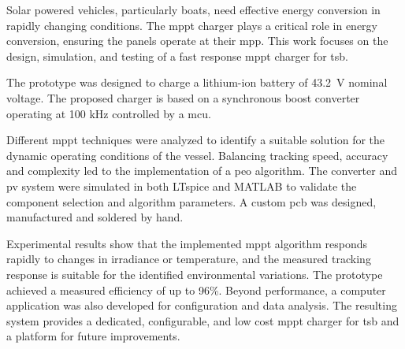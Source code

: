

\noindent Solar powered vehicles, particularly boats, need effective energy conversion in rapidly changing conditions. The \ac{mppt} charger plays a critical role in energy conversion, ensuring the panels operate at their \ac{mpp}. This work focuses on the design, simulation, and testing of a fast response \ac{mppt} charger for \ac{tsb}.

The prototype was designed to charge a lithium-ion battery of 43.2~V nominal voltage. The proposed charger is based on a synchronous boost converter operating at 100 kHz controlled by a \ac{mcu}. 

Different \ac{mppt} techniques were analyzed to identify a suitable solution for the dynamic operating conditions of the vessel. Balancing tracking speed, accuracy and complexity led to the implementation of a \ac{peo} algorithm. The converter and \ac{pv} system were simulated in both LTspice and MATLAB to validate the component selection and algorithm parameters. A custom \ac{pcb} was designed, manufactured and soldered by hand. 

Experimental results show that the implemented \ac{mppt} algorithm responds rapidly to changes in irradiance or temperature, and the measured tracking response is suitable for the identified environmental variations. The prototype achieved a measured efficiency of up to 96\%. Beyond performance, a computer application was also developed for configuration and data analysis. The resulting system provides a dedicated, configurable, and low cost \ac{mppt} charger for \ac{tsb} and a platform for future improvements.

\vspace{1cm}